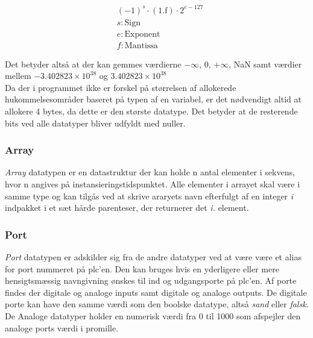 \begin{align*}
&(-1)^s \cdot (1.\text{f}) \cdot 2^{e-127} \\
&s: \text{Sign}\\
&e: \text{Exponent}\\
&f: \text{Mantissa}
\end{align*}

\noindent Det betyder altså at der kan gemmes værdierne $-\infty$, 0, $+\infty$, NaN samt værdier mellem $-3.402823 \times 10^{38}$ og $3.402823 \times 10^{38}$\\

\noindent Da der i programmet ikke er forskel på størrelsen af allokerede hukommelsesområder baseret på typen af en variabel, er det nødvendigt altid at allokere 4 bytes, da dette er den største datatype. Det betyder at de resterende bits ved alle datatyper bliver udfyldt med nuller.

\subsubsection*{Array}
\textit{Array} datatypen er en datastruktur der kan holde n antal elementer i sekvens, hvor n angives på instansieringstidspunktet. Alle elementer i arrayet skal være i samme type og kan tilgås ved at skrive araryets navn efterfulgt af en integer \textit{i} indpakket i et sæt hårde parenteser, der returnerer det \textit{i.} element.

\subsubsection*{Port}
\textit{Port} datatypen er adskilder sig fra de andre datatyper ved at være være et alias for port nummeret på \gls{plc}'en. Den kan bruges hvis en yderligere eller mere hensigtsmæssig navngivning ønskes til ind og udgangsporte på \gls{plc}'en.
Af porte findes der digitale og analoge inputs samt digitale og analoge outputs. De digitale porte kan have den samme værdi som den boolske datatype, altså \textit{sand} eller \textit{falsk}. De Analoge datatyper holder en numerisk værdi fra 0 til 1000 som afspejler den analoge ports værdi i promille.